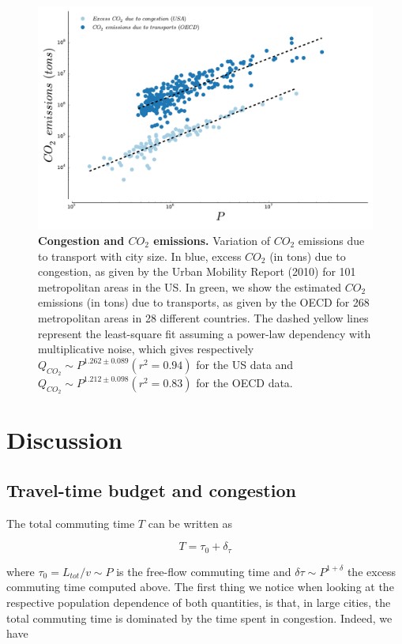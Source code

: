 \begin{figure}
    \includegraphics[width=0.9\linewidth]{gfx/chapter-scaling/scaling_co2.pdf}
    \caption{{\bf Congestion and $CO_2$ emissions.} Variation of $CO_2$
emissions due to transport with city size. In blue, excess $CO_2$ (in tons) due
to congestion, as given by the Urban Mobility Report (2010) for 101 metropolitan
areas in the US. In green, we show the estimated $CO_2$
emissions (in tons) due to transports, as given by the OECD for 268 metropolitan
areas in 28 different countries. The dashed yellow lines represent the least-square fit
assuming a power-law dependency with multiplicative noise, which gives
respectively $Q_{CO_2} \sim P^{1.262 \pm 0.089} (r^2=0.94)$ for the US data and
$Q_{CO_2} \sim P^{1.212 \pm 0.098} (r^2=0.83)$ for the OECD data.
\label{fig:scaling_co2}} 
\end{figure}



\section{Discussion}

\subsection{Travel-time budget and congestion}

The total commuting time $T$ can be written as

\begin{equation}
    T = \tau_0 + \delta_\tau
\end{equation}

where $\tau_0 = L_{tot} / v \sim P$ is the free-flow commuting time and $\delta
\tau \sim P^{1+\delta}$ the excess commuting time computed above. The first
thing we notice when looking at the respective population dependence of both
quantities, is that, in large cities, the total commuting time is dominated by
the time spent in congestion. Indeed, we have

